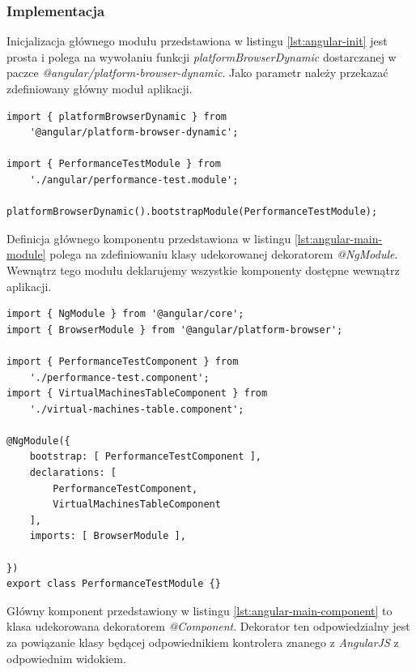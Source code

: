 \documentclass[polish, twoside, 12pt]{mwart}
\begin{document}
\subsubsection{Implementacja}

Inicjalizacja głównego modułu przedstawiona w listingu \ref{lst:angular-init} jest prosta i polega na wywołaniu funkcji \emph{platformBrowserDynamic} dostarczanej w paczce \emph{@angular/platform-browser-dynamic}. Jako parametr należy przekazać zdefiniowany główny moduł aplikacji.

\begin{lstlisting}[caption=Inicjalizacja głównego modułu, label={lst:angular-init}]
import { platformBrowserDynamic } from
    '@angular/platform-browser-dynamic';

import { PerformanceTestModule } from
    './angular/performance-test.module';

platformBrowserDynamic().bootstrapModule(PerformanceTestModule);
\end{lstlisting}

Definicja głównego komponentu przedstawiona w listingu \ref{lst:angular-main-module} polega na zdefiniowaniu klasy udekorowanej dekoratorem \emph{@NgModule}. Wewnątrz tego modułu deklarujemy wszystkie komponenty dostępne wewnątrz aplikacji.

\begin{lstlisting}[caption=Główny moduł, label={lst:angular-main-module}]
import { NgModule } from '@angular/core';
import { BrowserModule } from '@angular/platform-browser';

import { PerformanceTestComponent } from
    './performance-test.component';
import { VirtualMachinesTableComponent } from
    './virtual-machines-table.component';

@NgModule({
    bootstrap: [ PerformanceTestComponent ],
    declarations: [
        PerformanceTestComponent,
        VirtualMachinesTableComponent
    ],
    imports: [ BrowserModule ],

})
export class PerformanceTestModule {}
\end{lstlisting}

Główny komponent przedstawiony w listingu \ref{lst:angular-main-component} to klasa udekorowana dekoratorem \emph{@Component}. Dekorator ten odpowiedzialny jest za powiązanie klasy będącej odpowiednikiem kontrolera znanego z \emph{AngularJS} z odpowiednim widokiem.
\end{document}
